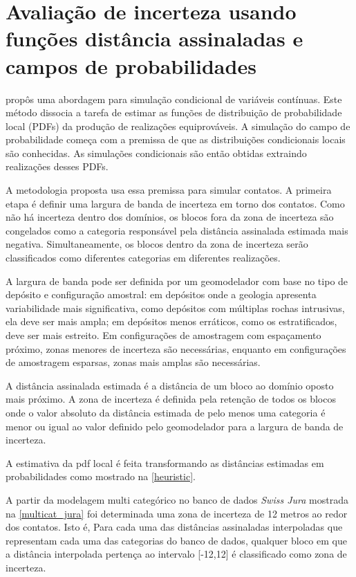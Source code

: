 \section{Avaliação de incerteza usando funções distância assinaladas e campos de probabilidades}\label{pfiels}

 propôs uma abordagem para simulação condicional de variáveis contínuas. Este método dissocia a tarefa de estimar as funções de distribuição de probabilidade local (PDFs) da produção de realizações equiprováveis. A simulação do campo de probabilidade começa com a premissa de que as distribuições condicionais locais são conhecidas. As simulações condicionais são então obtidas extraindo realizações desses PDFs.

A metodologia proposta usa essa premissa para simular contatos. A primeira etapa é definir uma largura de banda de incerteza em torno dos contatos. Como não há incerteza dentro dos domínios, os blocos fora da zona de incerteza são congelados como a categoria responsável pela distância assinalada estimada mais negativa. Simultaneamente, os blocos dentro da zona de incerteza serão classificados como diferentes categorias em diferentes realizações.

A largura de banda pode ser definida por um geomodelador com base no tipo de depósito e configuração amostral: em depósitos onde a geologia apresenta variabilidade mais significativa, como depósitos com múltiplas rochas intrusivas, ela deve ser mais ampla; em depósitos menos erráticos, como os estratificados, deve ser mais estreito. Em configurações de amostragem com espaçamento próximo, zonas menores de incerteza são necessárias, enquanto em configurações de amostragem esparsas, zonas mais amplas são necessárias.

A distância assinalada estimada é a distância de um bloco ao domínio oposto mais próximo. A zona de incerteza é definida pela retenção de todos os blocos onde o valor absoluto da distância estimada de pelo menos uma categoria é menor ou igual ao valor definido pelo geomodelador para a largura de banda de incerteza.

A estimativa da pdf local é feita transformando as distâncias estimadas em probabilidades como mostrado na \autoref{heuristic}.

A partir da modelagem multi categórico no banco de dados \textit{Swiss Jura} mostrada na \autoref{multicat_jura} foi determinada uma zona de incerteza de 12 metros ao redor dos contatos. Isto é, Para cada uma das distâncias assinaladas interpoladas que representam cada uma das categorias do banco de dados, qualquer bloco em que a distância interpolada pertença ao intervalo [-12,12] é classificado como zona de incerteza.

